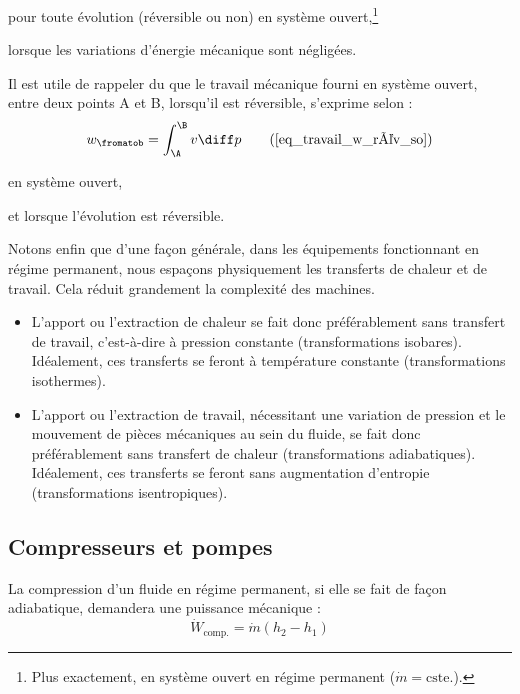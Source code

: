 		\begin{equationterms}
			\item pour toute évolution (réversible ou non) en système ouvert,\footnote{Plus exactement, en système ouvert en régime permanent ($\dot m = \text{cste.}$).}
			\item lorsque les variations d’énergie mécanique sont négligées.
		\end{equationterms}

		Il est utile de rappeler du \courstrois que le travail mécanique fourni en système ouvert, entre deux points A et B, lorsqu’il est réversible, s’exprime selon :
		\begin{equation}
				w_\fromatob =  \int_\A^\B v  \diff p  		\tag{\ref{eq_travail_w_rév_so}}
		\end{equation}

		\begin{description}
			\item en système ouvert,
			\item et lorsque l’évolution est réversible.
		\end{description}

		Notons enfin que d’une façon générale, dans les équipements fonctionnant en régime permanent, nous espaçons physiquement les transferts de chaleur et de travail. Cela réduit grandement la complexité des machines.

		\begin{itemize}
			\item L’apport ou l’extraction de chaleur se fait donc préférablement sans transfert de travail, c’est-à-dire à pression constante (transformations isobares). Idéalement, ces transferts se feront à température constante (transformations isothermes).
			\item L’apport ou l’extraction de travail, nécessitant une variation de pression et le mouvement de pièces mécaniques au sein du fluide, se fait donc préférablement sans transfert de chaleur (transformations adiabatiques). Idéalement, ces transferts se feront sans augmentation d’entropie (transformations isentropiques).
		\end{itemize}



	\subsection{Compresseurs et pompes}
	\label{ch_moteurs_vapeur_compresseurs_et_pompes}

		La compression d’un fluide en régime permanent, si elle se fait de façon adiabatique, demandera une puissance mécanique :
		\begin{equation}
			\dot{W}_\text{comp.} = \dot{m} (h_2 - h_1)
		\end{equation}

